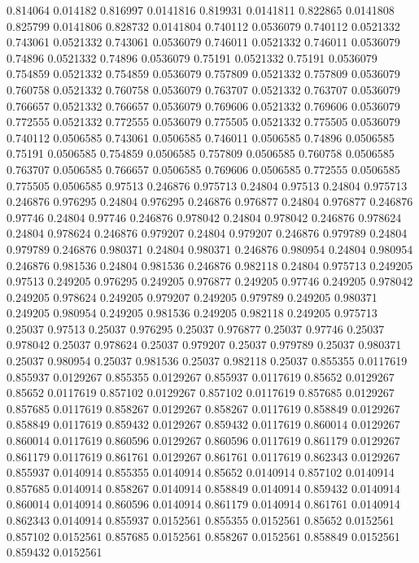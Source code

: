0.814064 0.014182
0.816997 0.0141816
0.819931 0.0141811
0.822865 0.0141808
0.825799 0.0141806
0.828732 0.0141804
0.740112 0.0536079
0.740112 0.0521332
0.743061 0.0521332
0.743061 0.0536079
0.746011 0.0521332
0.746011 0.0536079
0.74896 0.0521332
0.74896 0.0536079
0.75191 0.0521332
0.75191 0.0536079
0.754859 0.0521332
0.754859 0.0536079
0.757809 0.0521332
0.757809 0.0536079
0.760758 0.0521332
0.760758 0.0536079
0.763707 0.0521332
0.763707 0.0536079
0.766657 0.0521332
0.766657 0.0536079
0.769606 0.0521332
0.769606 0.0536079
0.772555 0.0521332
0.772555 0.0536079
0.775505 0.0521332
0.775505 0.0536079
0.740112 0.0506585
0.743061 0.0506585
0.746011 0.0506585
0.74896 0.0506585
0.75191 0.0506585
0.754859 0.0506585
0.757809 0.0506585
0.760758 0.0506585
0.763707 0.0506585
0.766657 0.0506585
0.769606 0.0506585
0.772555 0.0506585
0.775505 0.0506585
0.97513 0.246876
0.975713 0.24804
0.97513 0.24804
0.975713 0.246876
0.976295 0.24804
0.976295 0.246876
0.976877 0.24804
0.976877 0.246876
0.97746 0.24804
0.97746 0.246876
0.978042 0.24804
0.978042 0.246876
0.978624 0.24804
0.978624 0.246876
0.979207 0.24804
0.979207 0.246876
0.979789 0.24804
0.979789 0.246876
0.980371 0.24804
0.980371 0.246876
0.980954 0.24804
0.980954 0.246876
0.981536 0.24804
0.981536 0.246876
0.982118 0.24804
0.975713 0.249205
0.97513 0.249205
0.976295 0.249205
0.976877 0.249205
0.97746 0.249205
0.978042 0.249205
0.978624 0.249205
0.979207 0.249205
0.979789 0.249205
0.980371 0.249205
0.980954 0.249205
0.981536 0.249205
0.982118 0.249205
0.975713 0.25037
0.97513 0.25037
0.976295 0.25037
0.976877 0.25037
0.97746 0.25037
0.978042 0.25037
0.978624 0.25037
0.979207 0.25037
0.979789 0.25037
0.980371 0.25037
0.980954 0.25037
0.981536 0.25037
0.982118 0.25037
0.855355 0.0117619
0.855937 0.0129267
0.855355 0.0129267
0.855937 0.0117619
0.85652 0.0129267
0.85652 0.0117619
0.857102 0.0129267
0.857102 0.0117619
0.857685 0.0129267
0.857685 0.0117619
0.858267 0.0129267
0.858267 0.0117619
0.858849 0.0129267
0.858849 0.0117619
0.859432 0.0129267
0.859432 0.0117619
0.860014 0.0129267
0.860014 0.0117619
0.860596 0.0129267
0.860596 0.0117619
0.861179 0.0129267
0.861179 0.0117619
0.861761 0.0129267
0.861761 0.0117619
0.862343 0.0129267
0.855937 0.0140914
0.855355 0.0140914
0.85652 0.0140914
0.857102 0.0140914
0.857685 0.0140914
0.858267 0.0140914
0.858849 0.0140914
0.859432 0.0140914
0.860014 0.0140914
0.860596 0.0140914
0.861179 0.0140914
0.861761 0.0140914
0.862343 0.0140914
0.855937 0.0152561
0.855355 0.0152561
0.85652 0.0152561
0.857102 0.0152561
0.857685 0.0152561
0.858267 0.0152561
0.858849 0.0152561
0.859432 0.0152561
